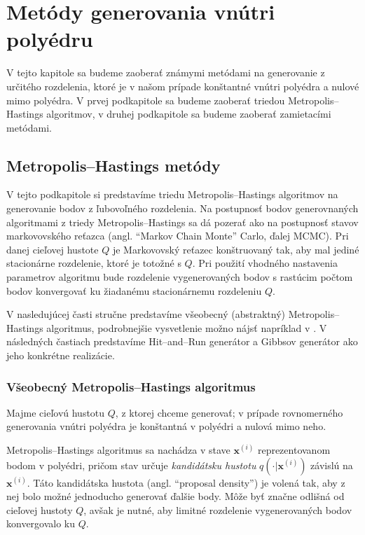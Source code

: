 \chapter{Metódy generovania vnútri polyédru}

V tejto kapitole sa budeme zaoberať známymi metódami na generovanie z určitého rozdelenia, ktoré je v našom prípade konštantné vnútri polyédra a nulové mimo polyédra. V prvej podkapitole sa budeme zaoberať triedou Metropolis--Hastings algoritmov, v druhej podkapitole sa budeme zaoberať zamietacími metódami.

\section{Metropolis--Hastings metódy}

V tejto podkapitole si predstavíme triedu Metropolis--Hastings algoritmov na generovanie bodov z ľubovoľného rozdelenia. Na postupnosť bodov generovnaných algoritmami z triedy Metropolis--Hastings sa dá pozerať ako na postupnosť stavov markovovského reťazca (angl. ``Markov Chain Monte'' Carlo, ďalej MCMC). Pri danej cieľovej hustote $Q$ je Markovovský reťazec konštruovaný tak, aby mal jediné stacionárne rozdelenie, ktoré je totožné s $Q$. Pri použití vhodného nastavenia parametrov algoritmu bude rozdelenie vygenerovaných bodov s rastúcim počtom bodov konvergovať ku žiadanému stacionárnemu rozdeleniu $Q$.

V nasledujúcej časti stručne predstavíme všeobecný (abstraktný) Metropolis--Hastings algoritmus, podrobnejšie vysvetlenie možno nájsť napríklad v \cite{metropolis-hastings_chib}. V následných častiach predstavíme Hit--and--Run generátor a Gibbsov generátor ako jeho konkrétne realizácie.

\subsection{Všeobecný Metropolis--Hastings algoritmus}

Majme cieľovú hustotu $Q$, z ktorej chceme generovať; v prípade rovnomerného generovania vnútri polyédra je konštantná v polyédri a nulová mimo neho.

Metropolis--Hastings algoritmus \cite{metropolis-hastings_chib} sa nachádza v stave $\mathbf x^{(i)}$ reprezentovanom bodom v polyédri, pričom stav určuje \textit{kandidátsku hustotu} $q(\cdot | \mathbf x^{(i)})$ závislú na $\mathbf x^{(i)}$. Táto kandidátska hustota (angl. ``proposal density'') je volená tak, aby z nej bolo možné jednoducho generovať ďalšie body. Môže byť značne odlišná od cieľovej hustoty $Q$, avšak je nutné, aby limitné rozdelenie vygenerovaných bodov konvergovalo ku $Q$.

